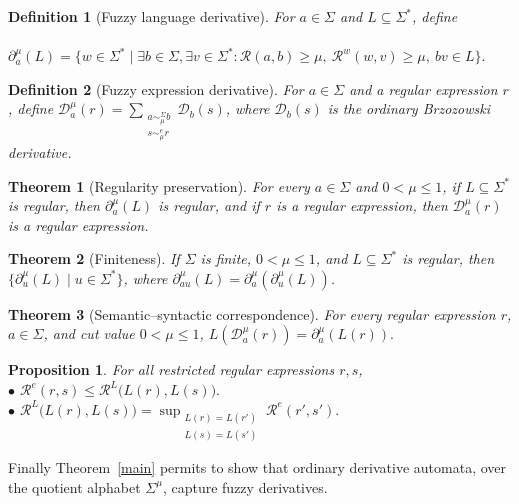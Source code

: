 \documentclass{easychair}
\newtheorem{definition}{Definition}
\newtheorem{theorem}{Theorem}
\newtheorem{proposition}{Proposition}
\begin{document}
\begin{definition}[Fuzzy language derivative]
For $a\in\Sigma$ and $L\subseteq\Sigma^\ast$, define\\
\ \ \ \ $
\partial_a^\mu(L)
=
\{w\in\Sigma^\ast\mid
\exists b\in\Sigma,\exists v\in\Sigma^\ast:
\mathcal R(a,b)\ge\mu,\ 
\mathcal R^w(w,v)\ge\mu,\ 
bv\in L
\}.
$
\end{definition}

\begin{definition}[Fuzzy expression derivative]
For $a\in\Sigma$ and a regular expression $r$, define
$\mathcal D_a^\mu(r)=\sum\limits_{\substack{a\sim_\mu^\Sigma b\\ s\sim_\mu^e r}}\mathcal D_b(s)$,
where $\mathcal D_b(s)$ is the ordinary Brzozowski derivative.
\end{definition}
\begin{theorem}[Regularity preservation] For every $a\in\Sigma$ and $0<\mu\le1$, if $L\subseteq\Sigma^\ast$ is regular, then
$\partial_a^\mu(L)$ is regular, and if $r$ is a regular expression, then $\mathcal D_a^\mu(r)$ is a regular expression.
\end{theorem}

\begin{theorem}[Finiteness]\label{finiteness}
If $\Sigma$ is finite,  $0<\mu\le1$, and $L\subseteq\Sigma^\ast$ is regular, then
$
\{\partial_u^\mu(L)\mid u\in\Sigma^\ast\}
$,
where $\partial_{au}^\mu(L)=\partial_{a}^\mu(\partial_{u}^\mu(L))$.
\end{theorem}

\begin{theorem}[Semantic--syntactic correspondence]
For every regular expression $r$,  $a\in\Sigma$, and cut value
$0<\mu\le1$, $
L(\mathcal D_a^\mu(r))
=
\partial_a^\mu(L(r)).
$
\end{theorem}

\begin{proposition} For all restricted regular expressions $r,s$,\\
$\bullet$ 
$
\mathcal{R}^e(r,s)
\le
\mathcal{R}^L\bigl(L(r),L(s)\bigr).
$\\
$\bullet$ $\mathcal{R}^L\bigl(L(r),L(s)\bigr)
= \sup_{\substack{L(r)=L(r')\\
L(s)=L(s')}}\mathcal R^e(r',s').$
\end{proposition}

Finally Theorem~\ref{main} permits to show that ordinary derivative
automata, over the quotient alphabet $\Sigma^\mu$, capture fuzzy derivatives. 
\end{document}
